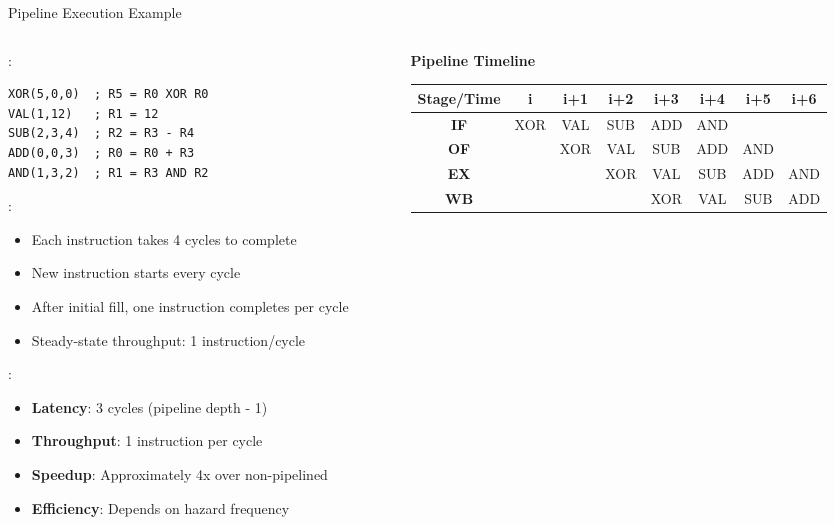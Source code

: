 \begin{frame}[fragile]{Pipeline Execution Example}
\begin{columns}
\begin{column}{0.6\textwidth}
:
\begin{lstlisting}
XOR(5,0,0)  ; R5 = R0 XOR R0
VAL(1,12)   ; R1 = 12
SUB(2,3,4)  ; R2 = R3 - R4
ADD(0,0,3)  ; R0 = R0 + R3
AND(1,3,2)  ; R1 = R3 AND R2
\end{lstlisting}

\vspace{0.3cm}
:
\begin{itemize}
\item Each instruction takes 4 cycles to complete
\item New instruction starts every cycle
\item After initial fill, one instruction completes per cycle
\item Steady-state throughput: 1 instruction/cycle
\end{itemize}

\vspace{0.3cm}
:
\begin{itemize}
\item \textbf{Latency}: 3 cycles (pipeline depth - 1)
\item \textbf{Throughput}: 1 instruction per cycle
\item \textbf{Speedup}: Approximately 4x over non-pipelined
\item \textbf{Efficiency}: Depends on hazard frequency
\end{itemize}
\end{column}
\begin{column}{0.4\textwidth}
\begin{center}
\textbf{Pipeline Timeline}
\vspace{0.3cm}

\begin{table}[h]
\tiny
\begin{tabular}{|c||c|c|c|c|c|c|c|}
\hline
\textbf{Stage/Time} & \textbf{i} & \textbf{i+1} & \textbf{i+2} & \textbf{i+3} & \textbf{i+4} & \textbf{i+5} & \textbf{i+6} \\
\hline\hline
\textbf{IF} & XOR & VAL & SUB & ADD & AND & & \\
\hline
\textbf{OF} & & XOR & VAL & SUB & ADD & AND & \\
\hline
\textbf{EX} & & & XOR & VAL & SUB & ADD & AND \\
\hline
\textbf{WB} & & & & XOR & VAL & SUB & ADD \\
\hline
\end{tabular}
\end{table}


\end{center}
\end{column}
\end{columns}
\end{frame}

